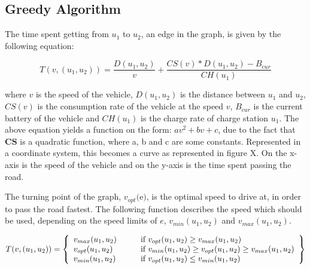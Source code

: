 \subsection{Greedy Algorithm}

The time spent getting from $u_1$ to $u_2$, an edge in the graph, is given by the following equation:

\[T(v,(u_1, u_2)) = \frac{D(u_1, u_2)}{v} + \frac{CS(v) * D(u_1, u_2) - B_{cur}}{CH(u_1)}\]

\begin{tikzpicture}
\end{tikzpicture}


where $v$ is the speed of the vehicle, $D(u_1, u_2)$ is the distance between $u_1$ and $u_2$, 
$CS(v)$ is the consumption rate of the vehicle at the speed $v$, $B_{cur}$ is the current battery
of the vehicle and $CH(u_1)$ is the charge rate of charge station $u_1$. The above equation yields 
a function on the form: $av^2 + bv + c$, due to the fact that $\textbf{CS}$ is a quadratic function, 
where a, b and c are some constants. Represented in a coordinate system, this becomes a curve as 
represented in figure X. On the x-axis is the speed of the vehicle and on the y-axis is the time 
spent passing the road. 

The turning point of the graph, $v_{opt}($e$)$, is the optimal speed to drive at, 
in order to pass the road fastest. The following function describes the speed which should be used, depending on the speed limits of $e$, $v_{min}(u_1, u_2)$ and $v_{max}(u_1, u_2)$.

\[ T(v, (u_1, u_2)) = \left\{ 
  \begin{array}{l l l}
    v_{max}(u_1, u_2) & \qquad \text{if $v_{opt}(u_1, u_2) \geq v_{max}(u_1, u_2)$}\\
    v_{opt}(u_1, u_2) & \qquad \text{if $v_{min}(u_1, u_2) \geq v_{opt}(u_1, u_2) \geq v_{max}(u_1, u_2)$}\\
    v_{min}(u_1, u_2) & \qquad \text{if $v_{opt}(u_1, u_2) \leq v_{min}(u_1, u_2)$}
  \end{array} \right\} \]
